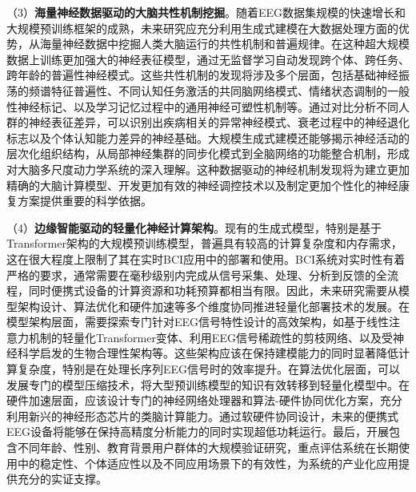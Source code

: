 （3）\textbf{海量神经数据驱动的大脑共性机制挖掘}。随着EEG数据集规模的快速增长和大规模预训练框架的成熟，未来研究应充分利用生成式建模在大数据处理方面的优势，从海量神经数据中挖掘人类大脑运行的共性机制和普遍规律。在这种超大规模数据上训练更加强大的神经表征模型，通过无监督学习自动发现跨个体、跨任务、跨年龄的普遍性神经模式。这些共性机制的发现将涉及多个层面，包括基础神经振荡的频谱特征普遍性、不同认知任务激活的共同脑网络模式、情绪状态调制的一般性神经标记、以及学习记忆过程中的通用神经可塑性机制等。通过对比分析不同人群的神经表征差异，可以识别出疾病相关的异常神经模式、衰老过程中的神经退化标志以及个体认知能力差异的神经基础。大规模生成式建模还能够揭示神经活动的层次化组织结构，从局部神经集群的同步化模式到全脑网络的功能整合机制，形成对大脑多尺度动力学系统的深入理解。这种数据驱动的神经机制发现将为建立更加精确的大脑计算模型、开发更加有效的神经调控技术以及制定更加个性化的神经康复方案提供重要的科学依据。

（4）\textbf{边缘智能驱动的轻量化神经计算架构}。现有的生成式模型，特别是基于Transformer架构的大规模预训练模型，普遍具有较高的计算复杂度和内存需求，这在很大程度上限制了其在实时BCI应用中的部署和使用。BCI系统对实时性有着严格的要求，通常需要在毫秒级别内完成从信号采集、处理、分析到反馈的全流程，同时便携式设备的计算资源和功耗预算都相当有限。因此，未来研究需要从模型架构设计、算法优化和硬件加速等多个维度协同推进轻量化部署技术的发展。在模型架构层面，需要探索专门针对EEG信号特性设计的高效架构，如基于线性注意力机制的轻量化Transformer变体、利用EEG信号稀疏性的剪枝网络、以及受神经科学启发的生物合理性架构等。这些架构应该在保持建模能力的同时显著降低计算复杂度，特别是在处理长序列EEG信号时的效率提升。在算法优化层面，可以发展专门的模型压缩技术，将大型预训练模型的知识有效转移到轻量化模型中。在硬件加速层面，应该设计专门的神经网络处理器和算法-硬件协同优化方案，充分利用新兴的神经形态芯片的类脑计算能力。通过软硬件协同设计，未来的便携式EEG设备将能够在保持高精度分析能力的同时实现超低功耗运行。最后，开展包含不同年龄、性别、教育背景用户群体的大规模验证研究，重点评估系统在长期使用中的稳定性、个体适应性以及不同应用场景下的有效性，为系统的产业化应用提供充分的实证支撑。

